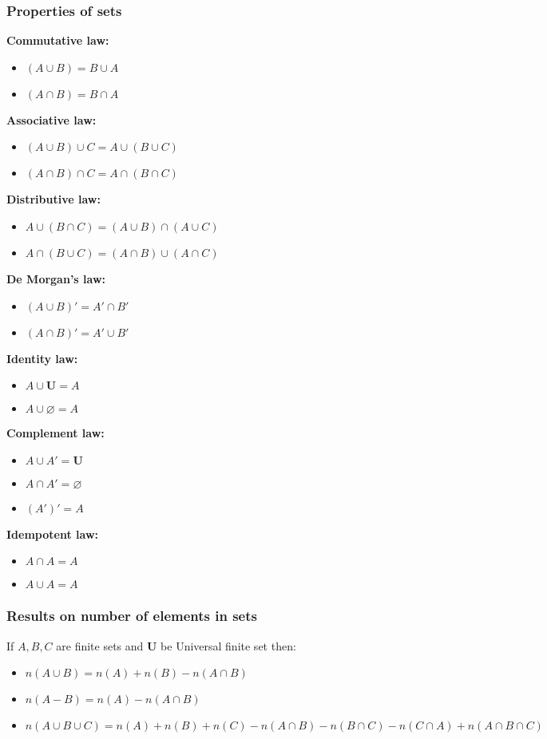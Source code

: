\documentclass[12pt]{article}
\begin{document}
\subsubsection{Properties of sets}
\textbf{Commutative law:}
\begin{itemize}
\item $(A \cup B)=B \cup A$
\item $(A \cap B)= B \cap A$
\end{itemize}
\textbf{Associative law:}
\begin{itemize}
\item $(A \cup B) \cup C=A \cup (B \cup C)$
\item $(A \cap B) \cap C=A \cap (B \cap C)$
\end{itemize}
\textbf{Distributive law:}
\begin{itemize}
\item $A \cup (B \cap C)=(A \cup B) \cap (A \cup C)$
\item $A \cap (B \cup C)=(A \cap B) \cup (A \cap C)$
\end{itemize}
\textbf{De Morgan's law:}
\begin{itemize}
\item $(A \cup B)' = A' \cap B'$
\item $(A \cap B)' = A' \cup B'$
\end{itemize}
\textbf{Identity law:}
\begin{itemize}
\item $A \cup \mathbf{U}=A$
\item $A \cup \varnothing=A$
\end{itemize}
\textbf{Complement law:}
\begin{itemize}
\item $A \cup A' = \mathbf{U}$
\item $A \cap A'= \varnothing$
\item $(A')'=A$
\end{itemize}
\textbf{Idempotent law:}
\begin{itemize}
\item $A \cap A=A$
\item $A \cup A=A$
\end{itemize}
\subsubsection{Results on number of elements in sets}
If $A,B,C$ are finite sets and $\mathbf{U}$ be Universal finite set then:
\begin{itemize}
\item $n(A \cup B)= n(A) + n(B) -n(A \cap B)$
\item $n(A-B)=n(A)-n(A \cap B)$
\item $n(A \cup B \cup C)=n(A)+n(B)+n(C)-n(A \cap B)-n(B \cap C)-n(C \cap A)+n(A \cap B \cap C)$
\end{itemize}
\end{document}
